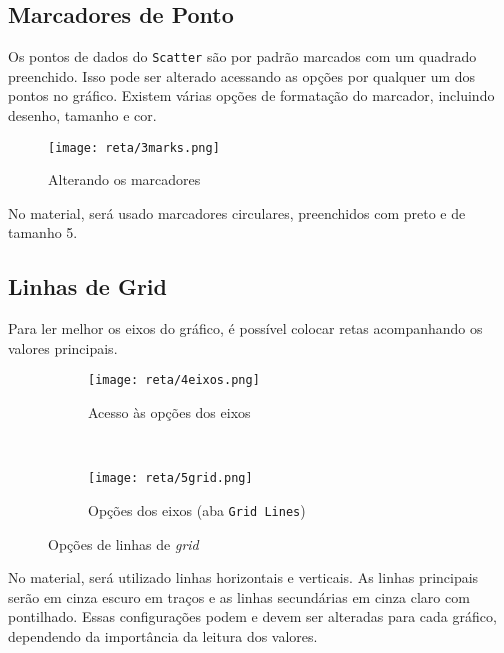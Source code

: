 \subsection{Marcadores de Ponto}

    Os pontos de dados do \texttt{Scatter} são por padrão marcados com um quadrado preenchido. Isso pode ser alterado acessando as opções por qualquer um dos pontos no gráfico. Existem várias opções de formatação do marcador, incluindo desenho, tamanho e cor.

    \begin{figure}[htbp]
        \centering
        \texttt{[image: reta/3marks.png]}

        \caption{Alterando os marcadores}
        \label{fig:reta:marcadores}
    \end{figure}

    No material, será usado marcadores circulares, preenchidos com preto e de tamanho 5.


\subsection{Linhas de Grid}

    Para ler melhor os eixos do gráfico, é possível colocar retas acompanhando os valores principais.

    \begin{figure}[htbp]
        \centering
        \begin{subfigure}{0.25\textwidth}
            \centering
            \texttt{[image: reta/4eixos.png]}

            \caption{Acesso às opções dos eixos}
            \label{fig:reta:eixos}
        \end{subfigure}
        ~
        \begin{subfigure}{0.7\textwidth}
            \centering
            \texttt{[image: reta/5grid.png]}

            \caption{Opções dos eixos (aba \texttt{Grid Lines})}
            \label{fig:reta:grid}
        \end{subfigure}
        \caption{Opções de linhas de \textit{grid}}
        \label{fig:reta:opcoes_eixo}
    \end{figure}

    No material, será utilizado linhas horizontais e verticais. As linhas principais serão em cinza escuro em traços e as linhas secundárias em cinza claro com pontilhado. Essas configurações podem e devem ser alteradas para cada gráfico, dependendo da importância da leitura dos valores.


